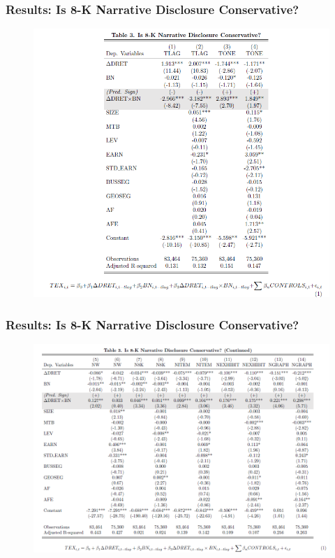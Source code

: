 \documentclass{beamer}
\begin{document}
\begin{frame}
\frametitle{Results: Is 8-K Narrative Disclosure Conservative?}
	\begin{figure}[h]
	\centering
	\includegraphics[width=0.7\linewidth]{tab3}
	\label{tab3}
	\end{figure}
\end{frame}
\begin{frame}
	\frametitle{Results: Is 8-K Narrative Disclosure Conservative?}
	\begin{figure}[h]
		\centering
		\includegraphics[width=0.8\linewidth]{tab3_cont}
		\label{tab3_cont}
	\end{figure}
\end{frame}
\end{document}
